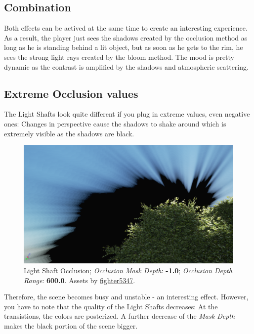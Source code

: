 \documentclass[A4]{article}
\begin{document}
	\subsection*{Combination}
	Both effects can be actived at the same time to create an interesting experience. As a result, the player just sees the shadows created by the occlusion method as long as he is standing behind a lit object, but as soon as he gets to the rim, he sees the strong light rays created by the bloom method. The mood is pretty dynamic as the contrast is amplified by the shadows and atmospheric scattering.
	
	\subsection*{Extreme Occlusion values}
	The Light Shafts look quite different if you plug in extreme values, even negative ones: Changes in perspective cause the shadows to shake around which is extremely visible as the shadows are black.
	\begin{figure}
		\vspace{-20px}
		\begin{center}
			\includegraphics[scale=0.13]{OcclusionExtreme.png}
		\end{center}
		\vspace{-20px}
		\caption{Light Shaft Occlusion; \textit{Occlusion Mask Depth}: \textbf{-1.0}; \textit{Occlusion Depth Range}: \textbf{600.0}. Assets by \href{https://forums.unrealengine.com/showthread.php?59812-FREE-Foliage-Starter-Kit}{fighter5347}.}
		\vspace{-10px}
	\end{figure}
	Therefore, the scene becomes busy and unstable - an interesting effect. However, you have to note that the quality of the Light Shafts decreases: At the transistions, the colors are posterized. A further decrease of the \textit{Mask Depth} makes the black portion of the scene bigger.\\
	
\end{document}
